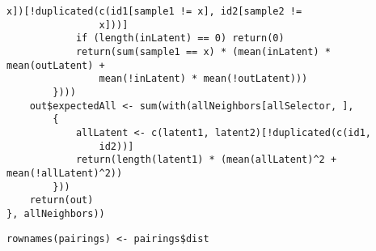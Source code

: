 \documentclass[../../sherrill-Mix_thesis.tex]{subfiles}
\makeatletter
\newenvironment{kframe}{%
 \def\at@end@of@kframe{}%
 \ifinner\ifhmode%
  \def\at@end@of@kframe{\end{minipage}}%
  \begin{minipage}{\columnwidth}%
 \fi\fi%
 \def\FrameCommand##1{\hskip\@totalleftmargin \hskip-\fboxsep
 \colorbox{shadecolor}{##1}\hskip-\fboxsep
     \hskip-\linewidth \hskip-\@totalleftmargin \hskip\columnwidth}%
 \MakeFramed {\advance\hsize-\width
   \@totalleftmargin\z@ \linewidth\hsize
   \@setminipage}}%
 {\par\unskip\endMakeFramed%
 \at@end@of@kframe}
\newenvironment{knitrout}{}{} %
\makeatother
\begin{document}
\begin{knitrout}
\begin{kframe}
\begin{lstlisting}[basicstyle=\ttfamily,breaklines=true]
                x])[!duplicated(c(id1[sample1 != x], id2[sample2 != 
                x]))]
            if (length(inLatent) == 0) return(0)
            return(sum(sample1 == x) * (mean(inLatent) * mean(outLatent) + 
                mean(!inLatent) * mean(!outLatent)))
        })))
    out$expectedAll <- sum(with(allNeighbors[allSelector, ], 
        {
            allLatent <- c(latent1, latent2)[!duplicated(c(id1, 
                id2))]
            return(length(latent1) * (mean(allLatent)^2 + mean(!allLatent)^2))
        }))
    return(out)
}, allNeighbors))\end{lstlisting}
\begin{lstlisting}[basicstyle=\ttfamily,breaklines=true]
rownames(pairings) <- pairings$dist\end{lstlisting}
\end{kframe}
\end{knitrout}
\end{document}
